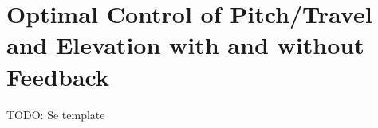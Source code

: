 \section{Optimal Control of Pitch/Travel and Elevation with and without Feedback}\label{sec:prob4}
TODO: Se template

